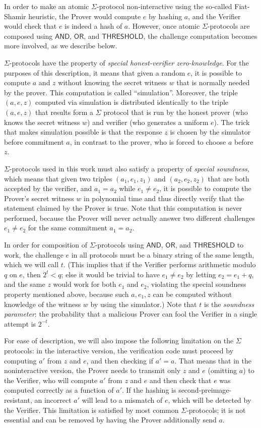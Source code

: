\documentclass[11pt]{article}
\newcommand{\andnode}{\ensuremath{\mathsf{AND}}}
\newcommand{\ornode}{\ensuremath{\mathsf{OR}}}
\newcommand{\tnode}{\ensuremath{\mathsf{THRESHOLD}}}
\begin{document}
In order to make an atomic $\Sigma$-protocol non-interactive using the so-called Fiat-Shamir heuristic, the Prover would compute $e$ by hashing $a$, and the Verifier would check that $e$ is indeed a hash of $a$. However, once atomic $\Sigma$-protocols are composed using $\andnode$, $\ornode$, and $\tnode$, the challenge computation becomes more involved, as we describe below.

$\Sigma$-protocols have the property of \emph{special honest-verifier zero-knowledge}. For the purposes of this description, it means that given a random $e$, it is possible to compute $a$ and $z$ without knowing the secret witness $w$ that is normally needed by the prover. This computation is called ``simulation''. Moreover, the triple $(a, e, z)$  computed via simulation is distributed identically to the triple $(a, e, z)$ that results form a $\Sigma$ protocol that is run by the honest prover (who knows the secret witness $w$) and verifier (who generates a uniform $e$). The trick that makes simulation possible is that the response $z$ is chosen by the simulator before commitment $a$, in contrast to the prover, who is forced to choose $a$ before $z$.

$\Sigma$-protocols used in this work must also satisfy a property of \emph{special soundness}, which means that given two triples $(a_1, e_1, z_1)$ and $(a_2, e_2, z_2)$ that are both accepted by the verifier, and $a_1=a_2$ while $e_1\neq e_2$, it is possible to compute the Prover's secret witness $w$ in polynomial time and thus directly verify that the statement claimed by the Prover is true.   Note that this computation is never performed, because the Prover will never actually answer two different challenges $e_1\neq e_2$ for the same commitment $a_1=a_2$. 

In order for composition of $\Sigma$-protocols using $\andnode$, $\ornode$, and $\tnode$ to work, the challenge $e$ in all protocols must be a binary string of the same length, which we will call $t$.  (This implies that if the Verifier performs arithmetic modulo $q$ on $e$, then $2^t<q$; else it would be trivial to have $e_1\neq e_2$ by letting $e_2=e_1+q$, and the same $z$ would work for both $e_1$ and $e_2$, violating the special soundness property mentioned above, because such $a, e_1, z$ can be computed without knowledge of the witness $w$ by using the simulator.)  Note that $t$ is the \emph{soundness parameter}: the probability that a malicious Prover can fool the Verifier in a single attempt is $2^{-t}$. 

 For ease of description, we will also impose the following limitation on the $\Sigma$ protocols: in the interactive version, the verification code must proceed by computing $a'$ from $z$ and $e$, and then checking if $a'=a$. That means that in the noninteractive version, the Prover needs to transmit only $z$ and $e$ (omitting $a$) to the Verifier, who will compute $a'$ from $z$ and $e$ and then check that $e$ was computed correctly as a function of $a'$. If the hashing is second-preimage-resistant, an incorrect $a'$ will lead to a mismatch of $e$, which will be detected by the Verifier. This limitation is satisfied by most common $\Sigma$-protocols; it is not essential and can be removed by having the Prover additionally send $a$.
\end{document}

